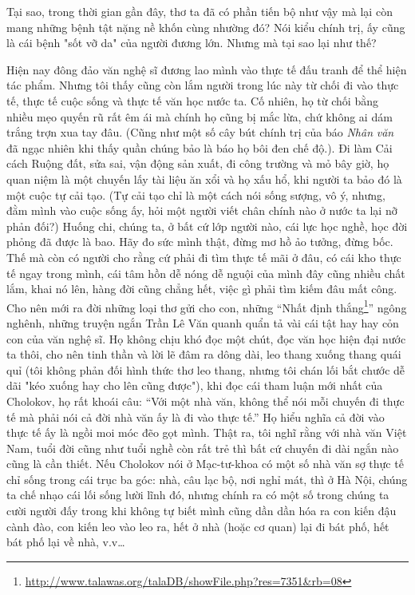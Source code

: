 \documentclass[../main.tex]{subfiles}
\begin{document}
\begin{multicols}{2}
Tại sao, trong thời gian gần đây, thơ ta đã có phần tiến bộ như vậy mà lại còn mang những bệnh tật nặng nề khốn cùng nhường đó? Nói kiểu chính trị, ấy cũng là cái bệnh "sốt vỡ da" của người đương lớn. Nhưng mà tại sao lại như thế? 
 
Hiện nay đông đảo văn nghệ sĩ đương lao mình vào thực tế đấu tranh để thể hiện tác phẩm. Nhưng tôi thấy cũng còn lắm người trong lúc này từ chối đi vào thực tế, thực tế cuộc sống và thực tế văn học nước ta. Cố nhiên, họ từ chối bằng nhiều mẹo quyến rũ rất êm ái mà chính họ cũng bị mắc lừa, chứ không ai dám trắng trợn xua tay đâu. (Cũng như một số cây bút chính trị của báo \textit{Nhân} \textit{văn} đã ngạc nhiên khi thấy quần chúng bảo là báo họ bôi đen chế độ.). Đi làm Cải cách Ruộng đất, sửa sai, vận động sản xuất, đi công trường và mỏ bây giờ, họ quan niệm là một chuyến lấy tài liệu ăn xổi và họ xấu hổ, khi người ta bảo đó là một cuộc tự cải tạo. (Tự cải tạo chỉ là một cách nói sống sượng, vô ý, nhưng, đằm mình vào cuộc sống ấy, hỏi một người viết chân chính nào ở nước ta lại nỡ phản đối?) Huống chi, chúng ta, ở bất cứ lớp người nào, cái lực học nghề, học đời phỏng đã được là bao. Hãy đo sức mình thật, đừng mơ hồ ảo tưởng, đừng bốc. Thế mà còn có người cho rằng cứ phải đi tìm thực tế mãi ở đâu, có cái kho thực tế ngay trong mình, cái tâm hồn dễ nóng dễ nguội của mình đây cũng nhiều chất lắm, khai nó lên, hàng đời cũng chẳng hết, việc gì phải tìm kiếm đâu mất công. Cho nên mới ra đời những loại thơ gửi cho con, những “Nhất định thắng\footnote{\url{http://www.talawas.org/talaDB/showFile.php?res=7351&rb=08}}” ngông nghênh, những truyện ngắn Trần Lê Văn quanh quẩn tả vài cái tật hay hay cỏn con của văn nghệ sĩ. Họ không chịu khó đọc một chút, đọc văn học hiện đại nước ta thôi, cho nên tinh thần và lời lẽ đâm ra dông dài, leo thang xuống thang quái quỉ (tôi không phản đối hình thức thơ leo thang, nhưng tôi chán lối bắt chước dễ dãi "kéo xuống hay cho lên cũng được"), khi đọc cái tham luận mới nhất của Cholokov, họ rất khoái câu: “Với một nhà văn, không thể nói mỗi chuyến đi thực tế mà phải nói cả đời nhà văn ấy là đi vào thực tế.” Họ hiểu nghĩa cả đời vào thực tế ấy là ngồi moi móc đẽo gọt mình. Thật ra, tôi nghĩ rằng với nhà văn Việt Nam, tuổi đời cũng như tuổi nghề còn rất trẻ thì bất cứ chuyến đi dài ngắn nào cũng là cần thiết. Nếu Cholokov nói ở Mạc-tư-khoa có một số nhà văn sợ thực tế chỉ sống trong cái trục ba góc: nhà, câu lạc bộ, nơi nghỉ mát, thì ở Hà Nội, chúng ta chế nhạo cái lối sống lười lĩnh đó, nhưng chính ra có một số trong chúng ta cười người đấy trong khi không tự biết mình cũng dần dần hóa ra con kiến đậu cành đào, con kiến leo vào leo ra, hết ở nhà (hoặc cơ quan) lại đi bát phố, hết bát phố lại về nhà, v.v… 
 

\end{multicols}
\end{document}
